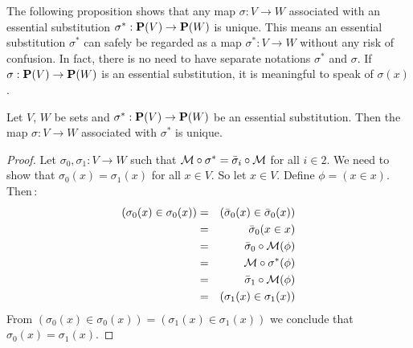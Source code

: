 The following proposition shows that any map $\sigma:V\to W$
associated with an essential substitution $\sigma^{*}:\mbox{${\bf P}(V)$}\to{\bf
P}(W)$ is unique. This means an essential substitution $\sigma^{*}$
can safely be regarded as a map $\sigma^{*}:V\to W$ without any risk
of confusion. In fact, there is no need to have separate notations
$\sigma^{*}$ and $\sigma$. If $\sigma:\mbox{${\bf P}(V)$}\to{\bf P}(W)$ is an
essential substitution, it is meaningful to speak of $\sigma(x)$.

\begin{prop}\label{logic:prop:FOPL:esssubstprop:uniqueness}
Let $V$, $W$ be sets and $\sigma^{*}:\mbox{${\bf P}(V)$}\to{\bf P}(W)$ be an
essential substitution. Then the map $\sigma:V\to W$ associated with
$\sigma^{*}$ is unique.
\end{prop}
\begin{proof}
Let $\sigma_{0},\sigma_{1}:V\to W$ such that ${\cal
M}\circ\sigma^{*}=\bar{\sigma}_{i}\circ{\cal M}$ for all $i\in 2$.
We need to show that $\sigma_{0}(x)=\sigma_{1}(x)$ for all $x\in V$.
So let $x\in V$. Define $\phi=(x\in x)$. Then\,:
    \begin{eqnarray*}
    (\sigma_{0}(x)\in\sigma_{0}(x))&=&(\bar{\sigma}_{0}(x)\in\bar{\sigma}_{0}(x))\\
    &=&\bar{\sigma}_{0}(x\in x)\\
    &=&\bar{\sigma}_{0}\circ{\cal
    M}(\phi)\\
    &=&{\cal M}\circ\sigma^{*}(\phi)\\
    &=&\bar{\sigma}_{1}\circ{\cal
    M}(\phi)\\
    &=&(\sigma_{1}(x)\in\sigma_{1}(x))
    \end{eqnarray*}
From
$(\sigma_{0}(x)\in\sigma_{0}(x))=(\sigma_{1}(x)\in\sigma_{1}(x))$ we
conclude that $\sigma_{0}(x)=\sigma_{1}(x)$.
\end{proof}

